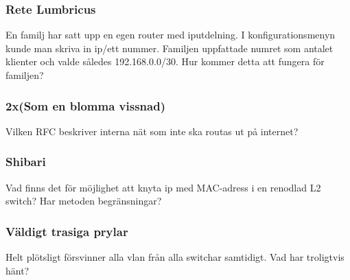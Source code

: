 \documentclass[a4paper]{report}
\begin{document}
\subsubsection{Rete Lumbricus}
En familj har satt upp en egen router med iputdelning. I konfigurationsmenyn kunde man skriva in ip/ett nummer. Familjen uppfattade numret som antalet klienter och valde således 192.168.0.0/30. Hur kommer detta att fungera för familjen?

\subsubsection{2x(Som en blomma vissnad)}
Vilken RFC beskriver interna nät som inte ska routas ut på internet? 

\subsubsection{Shibari}
Vad finns det för möjlighet att knyta ip med MAC-adress i en renodlad L2 switch? Har metoden begränsningar?

\subsubsection{Väldigt trasiga prylar}
Helt plötsligt försvinner alla vlan från alla switchar samtidigt. Vad har troligtvis hänt?
\end{document}
